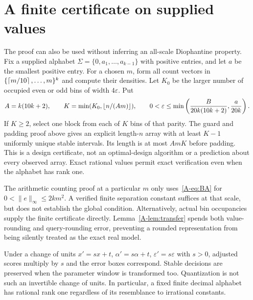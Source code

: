 \section{A finite certificate on supplied values}
The proof can also be used without inferring an all-scale Diophantine property. Fix a supplied alphabet $\Sigma=\{0,a_1,\ldots,a_{k-1}\}$ with positive entries, and let $a$ be the smallest positive entry. For a chosen $m$, form all count vectors in $\{\left\lceil m/10\right\rceil,\ldots,m\}^k$ and compute their densities. Let $K_0$ be the larger number of occupied even or odd bins of width $4\varepsilon$. Put
\begin{equation}\label{A-eq:finite-design}
A=k(10k+2),\qquad K=\min(K_0,\left\lfloor n/(Am)\right\rfloor),\qquad
0<\varepsilon\le\min\left(\frac{B}{20k(10k+2)},\frac{a}{20k}\right).
\end{equation}
If $K\ge2$, select one block from each of $K$ bins of that parity. The guard and padding proof above gives an explicit length-$n$ array with at least $K-1$ uniformly unique stable intervals. Its length is at most $AmK$ before padding. This is a design certificate, not an optimal-design algorithm or a prediction about every observed array. Exact rational values permit exact verification even when the alphabet has rank one.

The arithmetic counting proof at a particular $m$ only uses~\eqref{A-eq:BA} for $0<\|e\|_\infty\le2km^2$. A verified finite separation constant suffices at that scale, but does not establish the global condition. Alternatively, actual bin occupancies supply the finite certificate directly. Lemma~\ref{A-lem:transfer} spends both value-rounding and query-rounding error, preventing a rounded representation from being silently treated as the exact real model.

Under a change of units $x'=sx+t$, $\alpha'=s\alpha+t$, $\varepsilon'=s\varepsilon$ with $s>0$, adjusted scores multiply by $s$ and the error boxes correspond. Stable decisions are preserved when the parameter window is transformed too. Quantization is not such an invertible change of units. In particular, a fixed finite decimal alphabet has rational rank one regardless of its resemblance to irrational constants.

